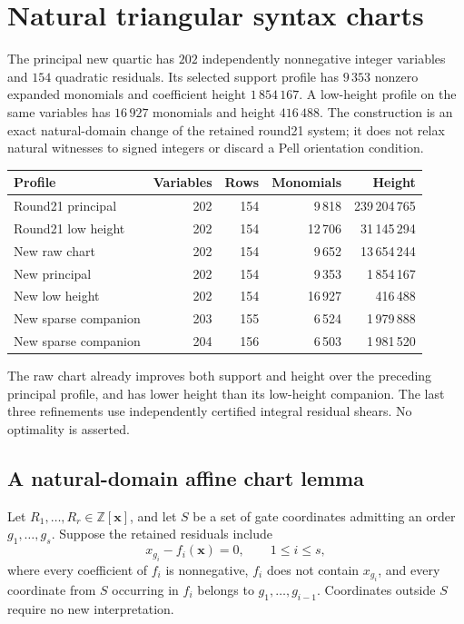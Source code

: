 \section{Natural triangular syntax charts}
\label{sec:natural-triangular-charts}

The principal new quartic has $202$ independently nonnegative integer
variables and $154$ quadratic residuals.  Its selected support profile has
$9\,353$ nonzero expanded monomials and coefficient height $1\,854\,167$.
A low-height profile on the same variables has $16\,927$ monomials and
height $416\,488$.  The construction is an exact natural-domain change of
the retained round21 system; it does not relax natural witnesses to signed
integers or discard a Pell orientation condition.

\begin{center}
\begin{tabular}{lrrrr}
Profile & Variables & Rows & Monomials & Height\\
\hline
Round21 principal &202&154&9\,818&239\,204\,765\\
Round21 low height &202&154&12\,706&31\,145\,294\\
New raw chart &202&154&9\,652&13\,654\,244\\
New principal &202&154&9\,353&1\,854\,167\\
New low height &202&154&16\,927&416\,488\\
New sparse companion &203&155&6\,524&1\,979\,888\\
New sparse companion &204&156&6\,503&1\,981\,520
\end{tabular}
\end{center}

The raw chart already improves both support and height over the preceding
principal profile, and has lower height than its low-height companion.
The last three refinements use independently certified integral residual
shears.  No optimality is asserted.

\subsection{A natural-domain affine chart lemma}

Let $R_1,\ldots,R_r\in\mathbb Z[\boldsymbol x]$, and let $S$ be a set
of gate coordinates admitting an order $g_1,\ldots,g_s$.  Suppose the
retained residuals include
\begin{equation}
 x_{g_i}-f_i(\boldsymbol x)=0,\qquad 1\leq i\leq s,
 \label{eq:triangular-gate-definitions}
\end{equation}
where every coefficient of $f_i$ is nonnegative, $f_i$ does not contain
$x_{g_i}$, and every coordinate from $S$ occurring in $f_i$ belongs to
$g_1,\ldots,g_{i-1}$.  Coordinates outside $S$ require no new interpretation.

